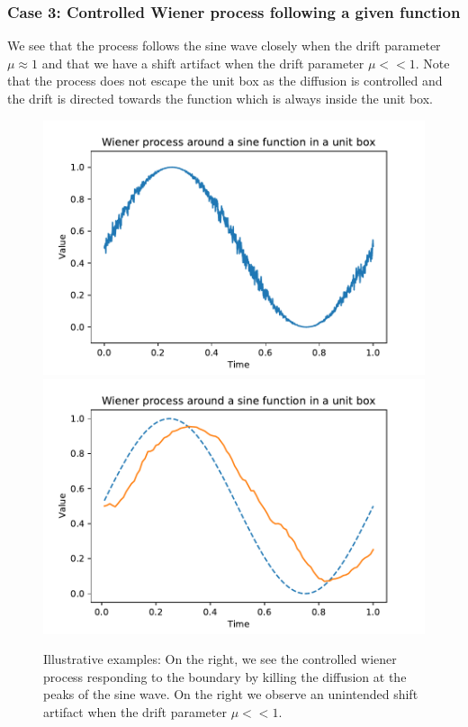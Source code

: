 \documentclass[aspectratio=169]{beamer}\usepackage[utf8]{inputenc}
\begin{document}
\begin{frame}\frametitle{Case 3: Controlled Wiener process following a given function }
We see that the process follows the sine wave  closely when the  drift parameter $\mu \approx 1$ and that we have a shift artifact when the drift parameter $\mu<<1$. Note that the process does not  escape the unit box as the diffusion is controlled and the drift is directed towards the function which is always inside the unit box.
\begin{figure}
  \includegraphics[scale=0.4]{Figures/Wiener_sine_box.pdf}
   \includegraphics[scale=0.4]{Figures/conv_sine_shift.pdf}
  \caption{Illustrative examples: On the right, we see the controlled wiener process responding to the boundary  by killing the diffusion at the peaks of the sine wave. On the right we observe an unintended  shift artifact when the drift parameter $\mu<<1$.   }
\end{figure}

\end{frame}
\end{document}
